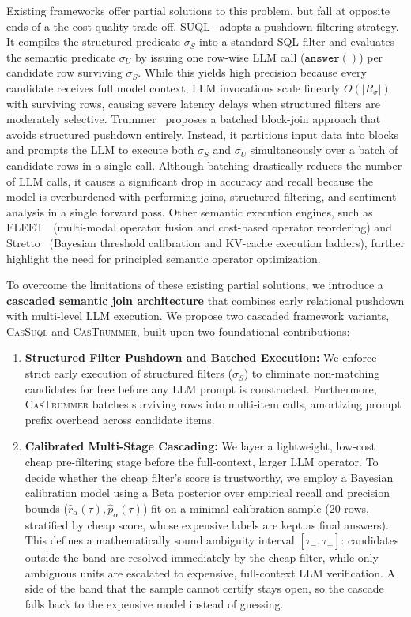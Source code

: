 Existing frameworks offer partial solutions to this problem, but fall at opposite ends of a the cost-quality trade-off. SUQL~\cite{liu2023suql} adopts a pushdown filtering strategy. It compiles the structured predicate $\sigma_S$ into a standard SQL filter and evaluates the semantic predicate $\sigma_U$ by issuing one row-wise LLM call ($\mathtt{answer()}$) per candidate row surviving $\sigma_S$. While this yields high precision because every candidate receives full model context, LLM invocations scale linearly $O(|R_\sigma|)$ with surviving rows, causing severe latency delays when structured filters are moderately selective. Trummer~\cite{trummer2025semanticjoin} proposes a batched block-join approach that avoids structured pushdown entirely. Instead, it partitions input data into blocks and prompts the LLM to execute both $\sigma_S$ and $\sigma_U$ simultaneously over a batch of candidate rows in a single call. Although batching drastically reduces the  number of LLM calls, it causes a significant drop in accuracy and recall because the model is overburdened with performing joins, structured filtering, and sentiment analysis in a single forward pass.
Other semantic execution engines, such as ELEET~\cite{urban2024eleet} (multi-modal operator fusion and cost-based operator reordering) and Stretto~\cite{sanmartino2025stretto} (Bayesian threshold calibration and KV-cache execution ladders), further highlight the need for principled semantic operator optimization.

To overcome the limitations of these existing partial solutions, we introduce a \textbf{cascaded semantic join architecture} that combines early relational pushdown with multi-level LLM execution. We propose two cascaded framework variants, \textsc{CasSuql} and \textsc{CasTrummer}, built upon two foundational contributions:
\begin{enumerate}
    \item \textbf{Structured Filter Pushdown and Batched Execution:} We enforce strict early execution of structured filters ($\sigma_S$) to eliminate non-matching candidates for free before any LLM prompt is constructed. Furthermore, \textsc{CasTrummer} batches surviving rows into multi-item calls, amortizing prompt prefix overhead across candidate items.
    \item \textbf{Calibrated Multi-Stage Cascading:} We layer a lightweight, low-cost cheap pre-filtering stage before the full-context, larger LLM operator. To decide whether the cheap filter's score is trustworthy, we employ a Bayesian calibration model using a Beta posterior over empirical recall and precision bounds ($\hat{r}_\alpha(\tau), \hat{p}_\alpha(\tau)$) fit on a minimal calibration sample (20 rows, stratified by cheap score, whose expensive labels are kept as final answers). This defines a mathematically sound ambiguity interval $[\tau_-, \tau_+]$: candidates outside the band are resolved immediately by the cheap filter, while only ambiguous units are escalated to expensive, full-context LLM verification. A side of the band that the sample cannot certify stays open, so the cascade falls back to the expensive model instead of guessing.
\end{enumerate}

